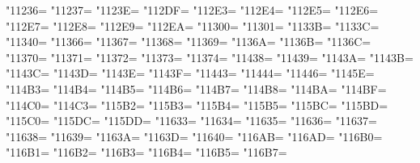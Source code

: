 \XeTeXcharclass"11236=\KclassNum
\XeTeXcharclass"11237=\KclassNum
\XeTeXcharclass"1123E=\KclassNum
\XeTeXcharclass"112DF=\KclassNum
\XeTeXcharclass"112E3=\KclassNum
\XeTeXcharclass"112E4=\KclassNum
\XeTeXcharclass"112E5=\KclassNum
\XeTeXcharclass"112E6=\KclassNum
\XeTeXcharclass"112E7=\KclassNum
\XeTeXcharclass"112E8=\KclassNum
\XeTeXcharclass"112E9=\KclassNum
\XeTeXcharclass"112EA=\KclassNum
\XeTeXcharclass"11300=\KclassNum
\XeTeXcharclass"11301=\KclassNum
\XeTeXcharclass"1133B=\KclassNum
\XeTeXcharclass"1133C=\KclassNum
\XeTeXcharclass"11340=\KclassNum
\XeTeXcharclass"11366=\KclassNum
\XeTeXcharclass"11367=\KclassNum
\XeTeXcharclass"11368=\KclassNum
\XeTeXcharclass"11369=\KclassNum
\XeTeXcharclass"1136A=\KclassNum
\XeTeXcharclass"1136B=\KclassNum
\XeTeXcharclass"1136C=\KclassNum
\XeTeXcharclass"11370=\KclassNum
\XeTeXcharclass"11371=\KclassNum
\XeTeXcharclass"11372=\KclassNum
\XeTeXcharclass"11373=\KclassNum
\XeTeXcharclass"11374=\KclassNum
\XeTeXcharclass"11438=\KclassNum
\XeTeXcharclass"11439=\KclassNum
\XeTeXcharclass"1143A=\KclassNum
\XeTeXcharclass"1143B=\KclassNum
\XeTeXcharclass"1143C=\KclassNum
\XeTeXcharclass"1143D=\KclassNum
\XeTeXcharclass"1143E=\KclassNum
\XeTeXcharclass"1143F=\KclassNum
\XeTeXcharclass"11443=\KclassNum
\XeTeXcharclass"11444=\KclassNum
\XeTeXcharclass"11446=\KclassNum
\XeTeXcharclass"1145E=\KclassNum
\XeTeXcharclass"114B3=\KclassNum
\XeTeXcharclass"114B4=\KclassNum
\XeTeXcharclass"114B5=\KclassNum
\XeTeXcharclass"114B6=\KclassNum
\XeTeXcharclass"114B7=\KclassNum
\XeTeXcharclass"114B8=\KclassNum
\XeTeXcharclass"114BA=\KclassNum
\XeTeXcharclass"114BF=\KclassNum
\XeTeXcharclass"114C0=\KclassNum
\XeTeXcharclass"114C3=\KclassNum
\XeTeXcharclass"115B2=\KclassNum
\XeTeXcharclass"115B3=\KclassNum
\XeTeXcharclass"115B4=\KclassNum
\XeTeXcharclass"115B5=\KclassNum
\XeTeXcharclass"115BC=\KclassNum
\XeTeXcharclass"115BD=\KclassNum
\XeTeXcharclass"115C0=\KclassNum
\XeTeXcharclass"115DC=\KclassNum
\XeTeXcharclass"115DD=\KclassNum
\XeTeXcharclass"11633=\KclassNum
\XeTeXcharclass"11634=\KclassNum
\XeTeXcharclass"11635=\KclassNum
\XeTeXcharclass"11636=\KclassNum
\XeTeXcharclass"11637=\KclassNum
\XeTeXcharclass"11638=\KclassNum
\XeTeXcharclass"11639=\KclassNum
\XeTeXcharclass"1163A=\KclassNum
\XeTeXcharclass"1163D=\KclassNum
\XeTeXcharclass"11640=\KclassNum
\XeTeXcharclass"116AB=\KclassNum
\XeTeXcharclass"116AD=\KclassNum
\XeTeXcharclass"116B0=\KclassNum
\XeTeXcharclass"116B1=\KclassNum
\XeTeXcharclass"116B2=\KclassNum
\XeTeXcharclass"116B3=\KclassNum
\XeTeXcharclass"116B4=\KclassNum
\XeTeXcharclass"116B5=\KclassNum
\XeTeXcharclass"116B7=\KclassNum
